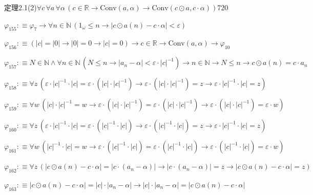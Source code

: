 \begin{fullproof}{定理2.1(2)}{$\forall c\,\forall a\,\forall \alpha\,(c \in \mathbb{R} \to \mathrm{Conv}(a,\alpha) \to \mathrm{Conv}(c \odot a,c \cdot \alpha))$}{720}
\begin{abbrevlist}
\item $\varphi_{155} :\equiv \varphi_{7} \to \forall n \in \mathbb{N}\,(1_{\omega} \leq n \to \lvert c \odot a(n) - c \cdot \alpha \rvert < \varepsilon)$
\item $\varphi_{156} :\equiv (\lvert c \rvert = \lvert 0 \rvert \to \lvert 0 \rvert = 0 \to \lvert c \rvert = 0) \to c \in \mathbb{R} \to \mathrm{Conv}(a,\alpha) \to \varphi_{10}$
\item $\varphi_{157} :\equiv N \in \mathbb{N} \land \forall n \in \mathbb{N}\,(N \leq n \to \lvert a_{n} - \alpha \rvert < \varepsilon \cdot \lvert c \rvert^{-1}) \to n \in \mathbb{N} \to N \leq n \to c \odot a(n) = c \cdot a_{n}$
\item $\varphi_{158} :\equiv \forall z\,(\varepsilon \cdot \lvert c \rvert^{-1} \cdot \lvert c \rvert = \varepsilon \cdot (\lvert c \rvert \cdot \lvert c \rvert^{-1}) \to \varepsilon \cdot (\lvert c \rvert \cdot \lvert c \rvert^{-1}) = z \to \varepsilon \cdot \lvert c \rvert^{-1} \cdot \lvert c \rvert = z)$
\item $\varphi_{159} :\equiv \forall w\,(\lvert c \rvert \cdot \lvert c \rvert^{-1} = w \to \varepsilon \cdot (\lvert c \rvert \cdot \lvert c \rvert^{-1}) = \varepsilon \cdot (\lvert c \rvert \cdot \lvert c \rvert^{-1}) \to \varepsilon \cdot (\lvert c \rvert \cdot \lvert c \rvert^{-1}) = \varepsilon \cdot w)$
\item $\varphi_{160} :\equiv \forall z\,(\varepsilon \cdot \lvert c \rvert^{-1} \cdot \lvert c \rvert = \varepsilon \cdot (\lvert c \rvert^{-1} \cdot \lvert c \rvert) \to \varepsilon \cdot (\lvert c \rvert^{-1} \cdot \lvert c \rvert) = z \to \varepsilon \cdot \lvert c \rvert^{-1} \cdot \lvert c \rvert = z)$
\item $\varphi_{161} :\equiv \forall w\,(\lvert c \rvert^{-1} \cdot \lvert c \rvert = w \to \varepsilon \cdot (\lvert c \rvert^{-1} \cdot \lvert c \rvert) = \varepsilon \cdot (\lvert c \rvert^{-1} \cdot \lvert c \rvert) \to \varepsilon \cdot (\lvert c \rvert^{-1} \cdot \lvert c \rvert) = \varepsilon \cdot w)$
\item $\varphi_{162} :\equiv \forall z\,(\lvert c \odot a(n) - c \cdot \alpha \rvert = \lvert c \cdot (a_{n} - \alpha) \rvert \to \lvert c \cdot (a_{n} - \alpha) \rvert = z \to \lvert c \odot a(n) - c \cdot \alpha \rvert = z)$
\item $\varphi_{163} :\equiv \lvert c \odot a(n) - c \cdot \alpha \rvert = \lvert c \rvert \cdot \lvert a_{n} - \alpha \rvert \to \lvert c \rvert \cdot \lvert a_{n} - \alpha \rvert = \lvert c \odot a(n) - c \cdot \alpha \rvert$

\end{abbrevlist}
\end{fullproof}
